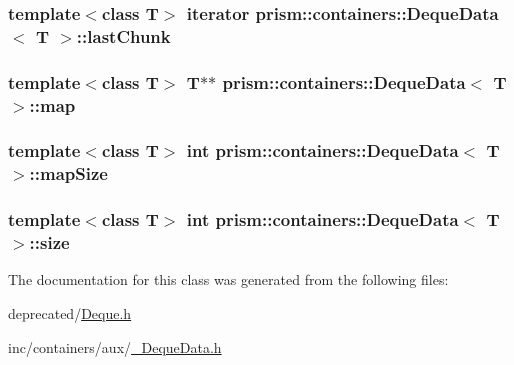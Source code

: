 \subsubsection[{\texorpdfstring{last\+Chunk}{lastChunk}}]{\setlength{\rightskip}{0pt plus 5cm}template$<$class T$>$ {\bf iterator} {\bf prism\+::containers\+::\+Deque\+Data}$<$ T $>$\+::last\+Chunk}\hypertarget{structprism_1_1containers_1_1_deque_data_a8f635e8ceaa6bca00bec0f54079abea4}{}\label{structprism_1_1containers_1_1_deque_data_a8f635e8ceaa6bca00bec0f54079abea4}
\subsubsection[{\texorpdfstring{map}{map}}]{\setlength{\rightskip}{0pt plus 5cm}template$<$class T$>$ T$\ast$$\ast$ {\bf prism\+::containers\+::\+Deque\+Data}$<$ T $>$\+::map}\hypertarget{structprism_1_1containers_1_1_deque_data_a1760fab65f72a59bf121f84042409462}{}\label{structprism_1_1containers_1_1_deque_data_a1760fab65f72a59bf121f84042409462}
\subsubsection[{\texorpdfstring{map\+Size}{mapSize}}]{\setlength{\rightskip}{0pt plus 5cm}template$<$class T$>$ int {\bf prism\+::containers\+::\+Deque\+Data}$<$ T $>$\+::map\+Size}\hypertarget{structprism_1_1containers_1_1_deque_data_a0fff90781042b14137e69017dc0d6479}{}\label{structprism_1_1containers_1_1_deque_data_a0fff90781042b14137e69017dc0d6479}
\subsubsection[{\texorpdfstring{size}{size}}]{\setlength{\rightskip}{0pt plus 5cm}template$<$class T$>$ int {\bf prism\+::containers\+::\+Deque\+Data}$<$ T $>$\+::size}\hypertarget{structprism_1_1containers_1_1_deque_data_a1c56f1c017d760cadb912ae82fc5722a}{}\label{structprism_1_1containers_1_1_deque_data_a1c56f1c017d760cadb912ae82fc5722a}


The documentation for this class was generated from the following files\+:\begin{DoxyCompactItemize}
\item 
deprecated/\hyperlink{deprecated_2_deque_8h}{Deque.\+h}\item 
inc/containers/aux/\hyperlink{___deque_data_8h}{\+\_\+\+Deque\+Data.\+h}\end{DoxyCompactItemize}
